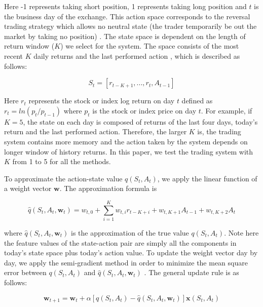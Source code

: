 \documentclass{article}
\begin{document}
\noindent Here -1 represents taking short position, 1 represents taking long position and $t$ is the business day of the exchange. This action space corresponds to the reversal trading strategy which allows no neutral state (the trader temporarily be out the market by taking no position) \cite{moody1998performance}. The state space is dependent on the length of return window ($K$) we select for the system. The space consists of the most recent $K$ daily returns and the last performed action \cite{corazza2015q}, which is described as follows:

\begin{equation}
	S_{t} = \left [ r_{t-K+1},...,r_{t}, A_{t-1} \right ]
\end{equation}

\noindent Here $r_{t}$ represents the stock or index log return on day $t$ defined as $r_{t} = ln\left ( p_{t}/p_{t-1} \right )$ where $p_{t}$ is the stock or index price on day $t$. For example, if $K = 5$, the state on each day is composed of returns of the last four days, today's return and the last performed action. Therefore, the larger $K$ is, the trading system contains more memory and the action taken by the system depends on longer window of history returns. In this paper, we test the trading system with $K$ from 1 to 5 for all the methods.

\indent To approximate the action-state value $q\left ( S_{t}, A_{t} \right )$, we apply the linear function of a weight vector $\mathbf{w}$. The approximation formula is 

\begin{equation}
	\hat{q}\left ( S_{t}, A_{t}, \mathbf{w}_{t} \right ) = w_{t,0}+\sum_{i=1}^{K}w_{t,i}r_{t-K+i} + w_{t,K+1}A_{t-1} +w_{t,K+2}A_{t}
\end{equation}

\noindent where $\hat{q}\left ( S_{t}, A_{t}, \mathbf{w}_{t} \right )$ is the approximation of the true value $q\left ( S_{t}, A_{t} \right )$. Note here the feature values of the state-action pair are simply all the components in today's state space plus today's action value. To update the weight vector day by day, we apply the semi-gradient method in order to minimize the mean square error between $q\left ( S_{t}, A_{t} \right )$ and $\hat{q}\left ( S_{t}, A_{t}, \mathbf{w}_{t} \right )$ \cite{sutton2018reinforcement}. The general update rule is as follows:

\begin{equation}
	\mathbf{w}_{t+1} = \mathbf{w}_{t}+\alpha \left [ q\left ( S_{t}, A_{t} \right )-\hat{q}\left ( S_{t}, A_{t}, \mathbf{w}_{t} \right ) \right ]\mathbf{x}\left ( S_{t}, A_{t} \right )
\end{equation}
\end{document}

